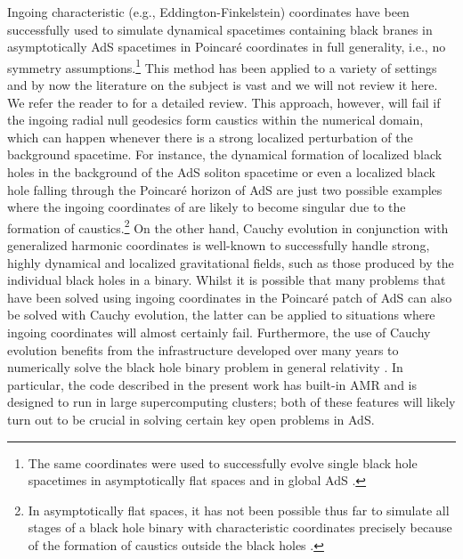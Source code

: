 \documentclass[aps,letterpaper,twocolumn,nofootinbib]{revtex4}
\numberwithin{equation}{section}
\begin{document}
Ingoing characteristic (e.g., Eddington-Finkelstein) coordinates have been successfully used to simulate dynamical spacetimes containing black branes in asymptotically AdS spacetimes in Poincar\'{e} coordinates in full generality, i.e., no symmetry assumptions.\footnote{The same coordinates were used to successfully evolve single black hole spacetimes in asymptotically flat spaces \cite{Gomez:1998uj} and in global AdS \cite{Chesler:2018txn}.} This method has been applied to a variety of settings and by now the literature on the subject is vast and we will not review it here. We refer the reader to \cite{Chesler:2013lia} for a detailed review. This approach, however, will fail if the ingoing radial null geodesics form caustics within the numerical domain, which can happen whenever there is a strong localized perturbation of the background spacetime. For instance, the dynamical formation of localized black holes in the background of the AdS soliton spacetime \cite{Bantilan:2020pay} or even a localized black hole falling through the Poincar\'{e} horizon of AdS are just two possible examples where the ingoing coordinates of \cite{Chesler:2013lia} are likely to become singular due to the formation of caustics.\footnote{In asymptotically flat spaces, it has not been possible thus far to simulate all stages of a black hole binary with characteristic coordinates precisely because of the formation of caustics outside the black holes \cite{Bishop:1997ik,Lehner:2001wq}.} 
On the other hand, Cauchy evolution in conjunction with generalized harmonic coordinates is well-known to successfully handle strong, highly dynamical and localized gravitational fields, such as those produced by the individual black holes in a binary. 
Whilst it is possible that many problems that have been solved using ingoing coordinates in the Poincar\'{e} patch of AdS can also be solved with Cauchy evolution, the latter can be applied to situations where ingoing coordinates will almost certainly fail. Furthermore, the use of Cauchy evolution benefits from the infrastructure developed over many years to numerically solve the black hole binary problem in general relativity \cite{Pretorius:2005gq,Campanelli:2005dd,Baker:2005vv}. 
In particular, the code described in the present work has built-in AMR and is designed to run in large supercomputing clusters; both of these features will likely turn out to be crucial in solving certain key open problems in AdS. 
\end{document}

